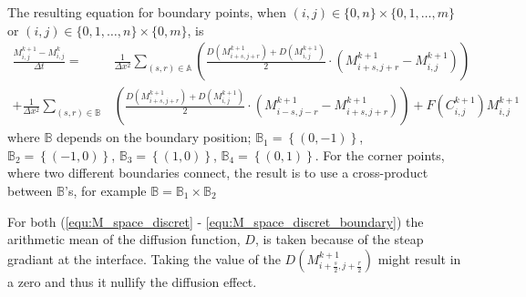 The resulting equation for boundary points, when $(i,j) \in \{0,n\} \times \{0,1,\ldots,m\}$ or $(i,j) \in \{0,1,\ldots,n\} \times \{0,m\}$, is
\begin{equation} \label{equ:M_space_discret_boundary}
  \begin{aligned}
  \frac{M^{k+1}_{i,j} - M^{k}_{i,j}}{\Delta t} =& 
    \frac{1}{\Delta x^2} \sum_{(s,r) \in \mathbb{A}}
    \left( \frac{D(M^{k+1}_{i+s,j+r}) + D(M^{k+1}_{i,j})}{2}
    \cdot ( M^{k+1}_{i+s, j+r} - M^{k+1}_{i,j}) \right)
    \\
    + \frac{1}{\Delta x^2} \sum_{(s,r) \in \mathbb{B}} &
    \left( \frac{D(M^{k+1}_{i+s,j+r}) + D(M^{k+1}_{i,j})}{2}
    \cdot ( M^{k+1}_{i-s, j-r} - M^{k+1}_{i+s, j+r}) \right)
    + F(C^{k+1}_{i,j}) M^{k+1}_{i,j}
  \end{aligned}
\end{equation}
where $\mathbb{B}$ depends on the boundary position;
$\mathbb{B}_1 = \left\{ (0,-1) \right\}$, $\mathbb{B}_2 = \left\{ (-1,0) \right\}$, $\mathbb{B}_3 = \left\{ (1,0) \right\}$, $\mathbb{B}_4 = \left\{ (0,1) \right\}$.
For the corner points, where two different boundaries connect, the result is to use a cross-product between $\mathbb{B}$'s, for example $\mathbb{B} = \mathbb{B}_1 \times \mathbb{B}_2$

For both (\ref{equ:M_space_discret} - \ref{equ:M_space_discret_boundary}) the arithmetic mean of the diffusion function, $D$, is taken because of the steap gradiant at the interface.
Taking the value of the $D(M^{k+1}_{i+\frac{s}{2}, j +\frac{r}{2}})$ might result in a zero and thus it nullify the diffusion effect.


